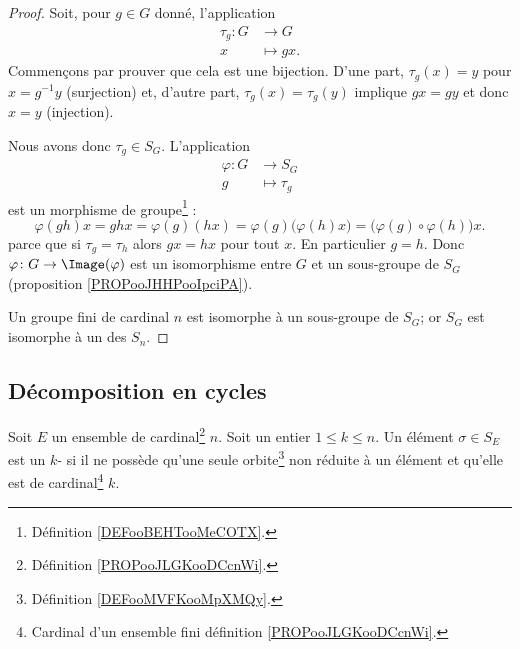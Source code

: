 \begin{proof}
	Soit, pour \( g\in G\) donné, l'application
	\begin{equation}
		\begin{aligned}
			\tau_g\colon G & \to G       \\
			x              & \mapsto gx.
		\end{aligned}
	\end{equation}
	Commençons par prouver que cela est une bijection.  D'une part, \( \tau_g(x)=y\) pour \( x=g^{-1} y\) (surjection) et, d'autre part, \( \tau_g(x)=\tau_g(y)\) implique \( gx=gy\) et donc \( x=y\) (injection).

	Nous avons donc \( \tau_g\in S_G\). L'application
	\begin{equation}
		\begin{aligned}
			\varphi\colon G & \to S_G        \\
			g               & \mapsto \tau_g
		\end{aligned}
	\end{equation}
	est un morphisme de groupe\footnote{Définition \ref{DEFooBEHTooMeCOTX}.} :
	\begin{equation}
		\varphi(gh)x=ghx=\varphi(g)(hx)=\varphi(g)\Big( \varphi(h)x \Big)=\Big( \varphi(g)\circ \varphi(h) \Big)x.
	\end{equation}
	 parce que si \( \tau_g=\tau_h\) alors \( gx=hx\) pour tout \( x\). En particulier \( g=h\). Donc \( \varphi\colon G\to \Image(\varphi)\) est un isomorphisme entre \( G\) et un sous-groupe de \( S_G\) (proposition \ref{PROPooJHHPooIpciPA}).

	Un groupe fini de cardinal \( n\) est isomorphe à un sous-groupe de \( S_G\); or \( S_G\) est isomorphe à un des \( S_n\).
\end{proof}


\subsection{Décomposition en cycles}

\begin{definition}		\label{DEFooRWYSooYmKwph}
	Soit \( E\) un ensemble de cardinal\footnote{Définition \ref{PROPooJLGKooDCcnWi}.} \( n\). Soit un entier \( 1\leq k\leq n\). Un élément \( \sigma\in S_E\) est un \( k\)- si il ne possède qu'une seule orbite\footnote{Définition \ref{DEFooMVFKooMpXMQy}.} non réduite à un élément et qu'elle est de cardinal\footnote{Cardinal d'un ensemble fini définition \ref{PROPooJLGKooDCcnWi}.} \( k\).
\end{definition}

